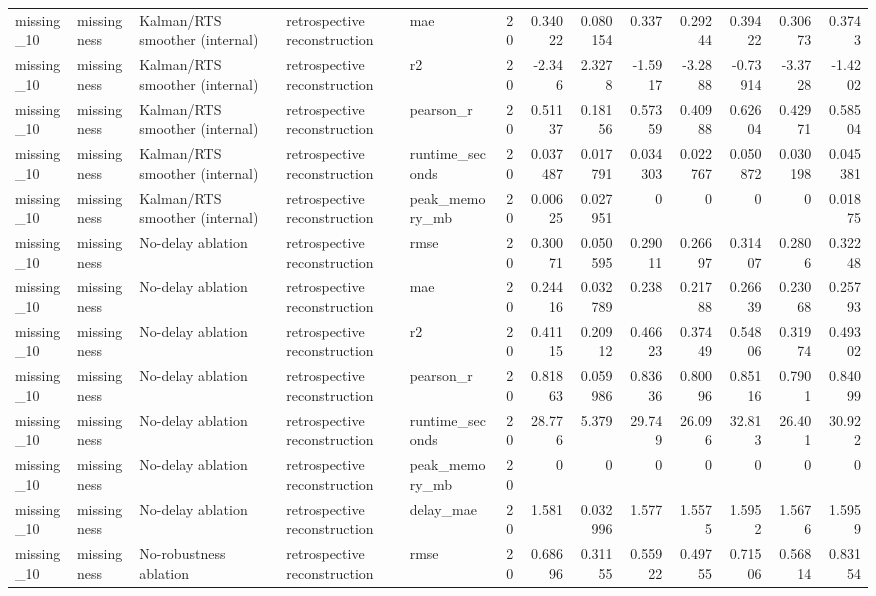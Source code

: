 \begin{table}[!htbp]
{{\begin{tabular}{lllllrrrrrrrr}
missing_10 & missingness & Kalman/RTS smoother (internal) & retrospective reconstruction & mae & 20 & 0.34022 & 0.080154 & 0.337 & 0.29244 & 0.39422 & 0.30673 & 0.3743 \\
missing_10 & missingness & Kalman/RTS smoother (internal) & retrospective reconstruction & r2 & 20 & -2.346 & 2.3278 & -1.5917 & -3.2888 & -0.73914 & -3.3728 & -1.4202 \\
missing_10 & missingness & Kalman/RTS smoother (internal) & retrospective reconstruction & pearson_r & 20 & 0.51137 & 0.18156 & 0.57359 & 0.40988 & 0.62604 & 0.42971 & 0.58504 \\
missing_10 & missingness & Kalman/RTS smoother (internal) & retrospective reconstruction & runtime_seconds & 20 & 0.037487 & 0.017791 & 0.034303 & 0.022767 & 0.050872 & 0.030198 & 0.045381 \\
missing_10 & missingness & Kalman/RTS smoother (internal) & retrospective reconstruction & peak_memory_mb & 20 & 0.00625 & 0.027951 & 0 & 0 & 0 & 0 & 0.01875 \\
missing_10 & missingness & No-delay ablation & retrospective reconstruction & rmse & 20 & 0.30071 & 0.050595 & 0.29011 & 0.26697 & 0.31407 & 0.2806 & 0.32248 \\
missing_10 & missingness & No-delay ablation & retrospective reconstruction & mae & 20 & 0.24416 & 0.032789 & 0.238 & 0.21788 & 0.26639 & 0.23068 & 0.25793 \\
missing_10 & missingness & No-delay ablation & retrospective reconstruction & r2 & 20 & 0.41115 & 0.20912 & 0.46623 & 0.37449 & 0.54806 & 0.31974 & 0.49302 \\
missing_10 & missingness & No-delay ablation & retrospective reconstruction & pearson_r & 20 & 0.81863 & 0.059986 & 0.83636 & 0.80096 & 0.85116 & 0.7901 & 0.84099 \\
missing_10 & missingness & No-delay ablation & retrospective reconstruction & runtime_seconds & 20 & 28.776 & 5.379 & 29.749 & 26.096 & 32.813 & 26.401 & 30.922 \\
missing_10 & missingness & No-delay ablation & retrospective reconstruction & peak_memory_mb & 20 & 0 & 0 & 0 & 0 & 0 & 0 & 0 \\
missing_10 & missingness & No-delay ablation & retrospective reconstruction & delay_mae & 20 & 1.581 & 0.032996 & 1.577 & 1.5575 & 1.5952 & 1.5676 & 1.5959 \\
missing_10 & missingness & No-robustness ablation & retrospective reconstruction & rmse & 20 & 0.68696 & 0.31155 & 0.55922 & 0.49755 & 0.71506 & 0.56814 & 0.83154 \\

\end{tabular}}}
\end{table}
